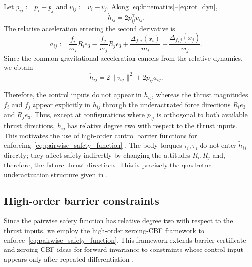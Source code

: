 \documentclass[journal,twoside,web]{ieeecolor}
\begin{document}
Let $p_{ij}:=p_i-p_j$ and $v_{ij}:=v_i-v_j$. Along
\eqref{eq:kinematics}--\eqref{eq:rot_dyn},
\begin{equation}
    \dot h_{ij}
    =
    2p_{ij}^{\top}v_{ij}.
    \label{eq:h_dot}
\end{equation}
The relative acceleration entering the second derivative is
\begin{equation}
    a_{ij}
    :=
    \frac{f_i}{m_i}R_ie_3
    -
    \frac{f_j}{m_j}R_je_3
    +
    \frac{\Delta_{f,i}(x_i)}{m_i}
    -
    \frac{\Delta_{f,j}(x_j)}{m_j}.
    \label{eq:relative_acceleration}
\end{equation}
Since the common gravitational acceleration cancels from the
relative dynamics, we obtain
\begin{equation}
    \ddot h_{ij}
    =
    2\|v_{ij}\|^2
    +
    2p_{ij}^{\top}a_{ij}.
    \label{eq:h_ddot}
\end{equation}

Therefore, the control inputs do not appear in $\dot h_{ij}$,
whereas the thrust magnitudes $f_i$ and $f_j$ appear explicitly
in $\ddot h_{ij}$ through the underactuated force directions
$R_ie_3$ and $R_je_3$. Thus, except at configurations where \(p_{ij}\) is orthogonal to both
available thrust directions, \(h_{ij}\) has relative degree two with
respect to the thrust inputs. This motivates the use of high-order
control barrier functions for enforcing~\eqref{eq:pairwise_safety_function}
\cite{NguyenACC2016,XiaoCDC2019}. The body torques
$\tau_i,\tau_j$ do not enter $\ddot h_{ij}$ directly; they affect
safety indirectly by changing the attitudes $R_i,R_j$ and,
therefore, the future thrust directions. This is precisely the
quadrotor underactuation structure given in \cite{lee2010geometric}.

\subsection{High-order barrier constraints}

Since the pairwise safety function has relative degree two
with respect to the thrust inputs, we employ the high-order
zeroing-CBF framework to enforce~\eqref{eq:pairwise_safety_function}.
This framework extends barrier-certificate and zeroing-CBF
ideas for forward invariance to constraints whose control input
appears only after repeated differentiation
\cite{AmesTAC2017,
NguyenACC2016,XiaoCDC2019,TanShawCortezDimarogonas2022}.
\end{document}
